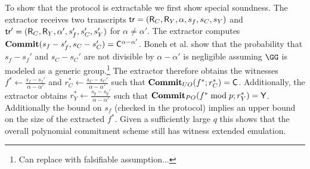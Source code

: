  To show that the protocol is extractable we first show special soundness. The extractor receives two transcripts $\textsf{{tr}}=(\mathsf{R}_C,\mathsf{R}_Y,\alpha,s_f,s_C,s_Y)$ and $\textsf{{tr}}'=(\mathsf{R}_C,\mathsf{R}_Y,\alpha',s_f',s_C',s_Y')$ for $\alpha \neq \alpha'$. The extractor computes $\textbf{{Commit}}(s_f-s_f',s_C-s_C')=\mathsf{C}^{\alpha-\alpha'}$. Boneh et al. \cite{C:BonBunFis19} show that the probability that $s_f-s_f'$ and $s_C-s_C'$  are not divisible by $\alpha-\alpha'$ is negligible assuming $\GG$ is modeled as a generic group.\footnote{Can replace with falsifiable assumption...} The extractor therefore obtains the witnesses $f^* \leftarrow \frac{ s_f-s_f'}{\alpha-\alpha'}$ and $r_C^* \leftarrow \frac{ s_C-s_C'}{\alpha-\alpha'}$ such that $\textbf{{Commit}}_{UO}(f^*; r_C^*)=\mathsf{C}$. Additionally, the extractor obtains $r_Y^* \leftarrow \frac{s_y-s_y'}{\alpha-\alpha'}$ such that $\textbf{{Commit}}_{PO}( f^* \bmod p; r_Y^*)=\mathsf{Y}$. %
 Additionally the bound on $s_f$ (checked in the protocol) implies an upper bound on the size of the extracted $f^*$. 
 Given a sufficiently large $q$ this shows that the overall polynomial commitment scheme still has witness extended emulation.
